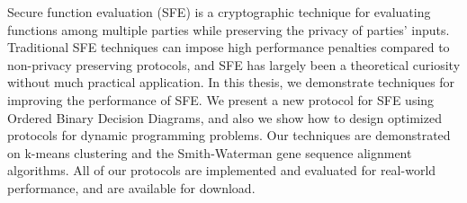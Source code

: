 Secure function evaluation (SFE) is a cryptographic technique for evaluating
functions among multiple parties while preserving the privacy of parties'
inputs.  Traditional SFE techniques can impose high performance penalties 
compared to non-privacy preserving protocols, and SFE has largely been a
theoretical curiosity without much practical application.  In this thesis, 
we demonstrate techniques for improving the performance of SFE.  We present
a new protocol for SFE using Ordered Binary Decision Diagrams, and also we
show how to design optimized protocols for dynamic programming problems.
Our techniques are demonstrated on k-means clustering and the Smith-Waterman
gene sequence alignment algorithms.  All of our protocols are implemented and
evaluated for real-world performance, and are available for download.
